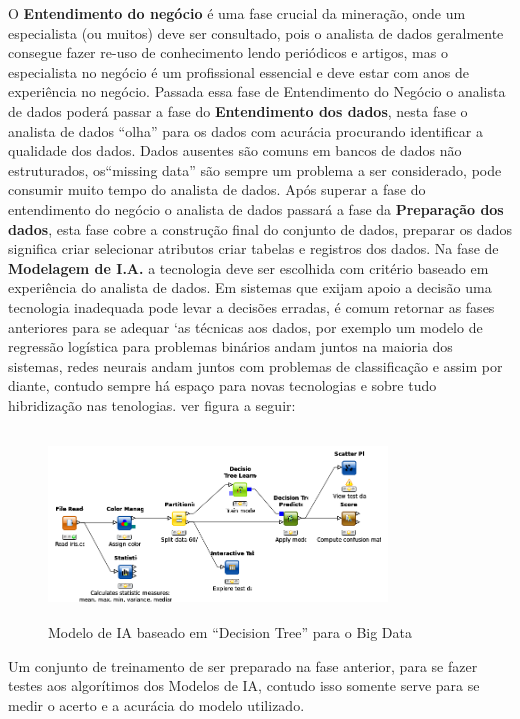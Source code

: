 \documentclass[conference,compsoc]{IEEEtran}
\begin{document}
O \textbf{Entendimento do negócio} é uma fase crucial da mineração, onde um especialista (ou muitos) deve ser consultado, pois o analista de dados geralmente consegue fazer re-uso de conhecimento lendo periódicos e artigos, mas o especialista no negócio é um profissional essencial e deve estar com anos de experiência no negócio.
Passada essa fase de Entendimento do Negócio o analista de dados poderá passar a fase do \textbf{Entendimento dos dados}, nesta fase o analista de dados ``olha'' para os dados com acurácia procurando identificar a qualidade dos dados. Dados ausentes são comuns em bancos de dados não estruturados, os``missing data'' são sempre um problema a ser considerado, pode consumir muito tempo do analista de dados. 
Após superar a fase do entendimento do negócio o analista de dados passará a fase da \textbf{Preparação dos dados}, esta fase cobre a construção final do conjunto de dados, preparar os dados significa criar selecionar atributos criar tabelas e registros dos dados. 
Na fase de \textbf{Modelagem de I.A.} a tecnologia deve ser escolhida com critério baseado em experiência do analista de dados. Em sistemas que exijam apoio a decisão uma tecnologia inadequada pode levar a decisões erradas, é comum retornar as fases anteriores para se adequar `as técnicas aos dados, por exemplo um modelo de regressão logística para problemas binários andam juntos na maioria dos sistemas, redes neurais andam juntos com problemas de classificação e assim por diante, contudo sempre há espaço para novas tecnologias e sobre tudo hibridização nas tenologias. ver figura a seguir:

\begin{figure}[!ht]
\centering
\caption{Modelo de IA baseado em ``Decision Tree'' para o Big Data}
\flushleft
\includegraphics[width=90mm, height=50mm]{Figuras/workflow.png}
\end{figure}

Um conjunto de treinamento de ser preparado na fase anterior, para se fazer testes aos algorítimos dos Modelos de IA, contudo isso somente serve para se medir o acerto e a acurácia do modelo utilizado.
\end{document}

